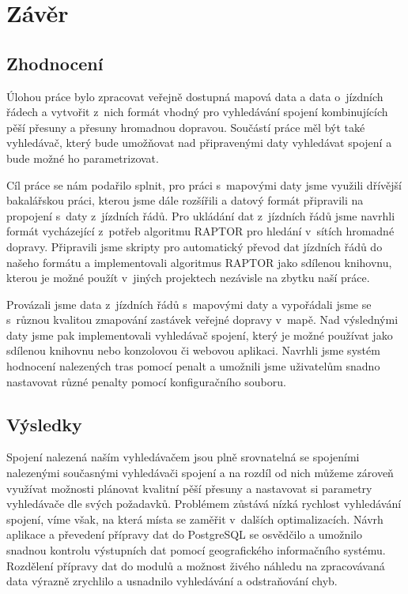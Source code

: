 \chapter{Závěr}

\section{Zhodnocení}
Úlohou práce bylo zpracovat veřejně dostupná mapová data a data o~jízdních
řádech a vytvořit z~nich formát vhodný pro vyhledávání spojení kombinujících
pěší přesuny a přesuny hromadnou dopravou. Součástí práce měl být také
vyhledávač, který bude umožňovat nad připravenými daty vyhledávat spojení a bude
možné ho parametrizovat.

Cíl práce se nám podařilo splnit, pro práci s~mapovými daty jsme využili
dřívější bakalářskou práci, kterou jsme dále rozšířili a datový formát
připravili na propojení s~daty z~jízdních řádů. Pro ukládání dat z~jízdních
řádů jsme navrhli formát vycházející z~potřeb algoritmu RAPTOR pro hledání
v~sítích hromadné dopravy. Připravili jsme skripty pro automatický převod dat
jízdních řádů do našeho formátu a implementovali algoritmus RAPTOR jako sdílenou
knihovnu, kterou je možné použít v~jiných projektech nezávisle na zbytku naší
práce. 

Provázali jsme data z~jízdních řádů s~mapovými daty a vypořádali jsme se
s~různou kvalitou zmapování zastávek veřejné dopravy v~mapě. Nad výslednými daty
jsme pak implementovali vyhledávač spojení, který je možné používat jako
sdílenou knihovnu nebo konzolovou či webovou aplikaci. Navrhli jsme systém
hodnocení nalezených tras pomocí penalt a umožnili jsme uživatelům snadno
nastavovat různé penalty pomocí konfiguračního souboru. 

\section{Výsledky}
Spojení nalezená naším vyhledávačem jsou plně srovnatelná se spojeními
nalezenými současnými vyhledávači spojení a na rozdíl od nich můžeme zároveň
využívat možnosti plánovat kvalitní pěší přesuny a nastavovat si parametry
vyhledávače dle svých požadavků. Problémem zůstává nízká rychlost vyhledávání
spojení, víme však, na která místa se zaměřit v~dalších optimalizacích. Návrh
aplikace a převedení přípravy dat do PostgreSQL se osvědčilo a umožnilo snadnou
kontrolu výstupních dat pomocí geografického informačního systému. Rozdělení
přípravy dat do modulů a možnost živého náhledu na zpracovávaná data výrazně
zrychlilo a usnadnilo vyhledávání a odstraňování chyb.

